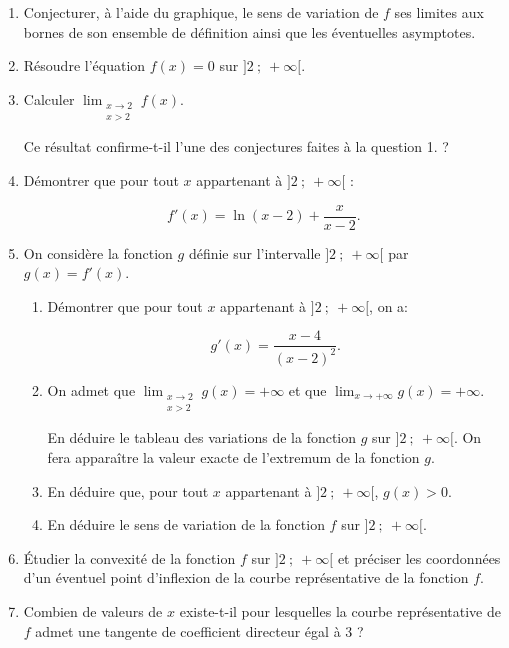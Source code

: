 \begin{enumerate}
\item Conjecturer, à l'aide du graphique, le sens de variation de $f$ ses limites aux bornes
de son ensemble de définition ainsi que les éventuelles asymptotes.
\item Résoudre l'équation $f(x) = 0$ sur $]2~;~+\infty[$.
\item Calculer $\displaystyle\lim_{\substack{x \to 2\\x > 2}} f(x)$.

Ce résultat confirme-t-il l'une des conjectures faites à la question 1. ?
\item Démontrer que pour tout $x$ appartenant à $]2~;~+\infty[$ :

\[f'(x) = \ln (x - 2) + \dfrac{x}{x - 2}.\]
\item On considère la fonction $g$ définie sur l'intervalle $]2~;~+\infty[$ par $g(x) = f'(x)$.
	\begin{enumerate}
		\item Démontrer que pour tout $x$ appartenant à $]2~;~+\infty[$, on a:

\[g'(x) = \dfrac{x - 4}{(x - 2)^2}.\]

		\item On admet que $\displaystyle\lim_{\substack{x \to 2\\x>2}} g(x) = + \infty$ et que $\displaystyle\lim_{x \to + \infty} g(x) = +\infty$.

En déduire le tableau des variations de la fonction $g$ sur $]2~;~+\infty[$. On fera apparaître la valeur exacte de l'extremum de la fonction $g$.
		\item En déduire que, pour tout $x$ appartenant à $]2~;~+\infty[$,\: $g(x) > 0$.
		\item En déduire le sens de variation de la fonction $f$ sur $]2~;~+\infty[$.
	\end{enumerate}
\item Étudier la convexité de la fonction $f$ sur $]2~;~+\infty[$ et préciser les coordonnées d'un éventuel point d'inflexion de la courbe représentative de la fonction $f$.
\item Combien de valeurs de $x$ existe-t-il pour lesquelles la courbe représentative de $f$
admet une tangente de coefficient directeur égal à $3$ ?
\end{enumerate}

\bigskip

